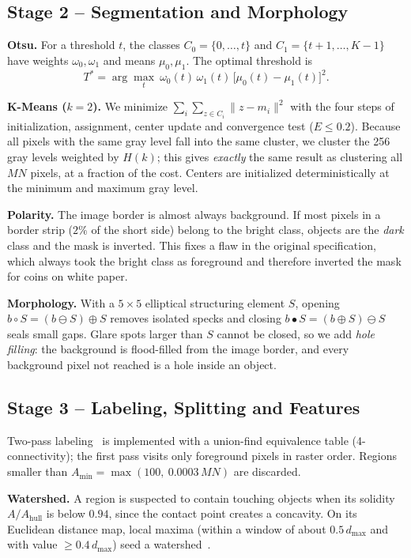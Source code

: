 \documentclass[conference,a4paper]{IEEEtran}
\begin{document}
\subsection{Stage 2 -- Segmentation and Morphology}
\textbf{Otsu.} For a threshold $t$, the classes $C_0=\{0,\dots,t\}$ and $C_1=\{t+1,\dots,K-1\}$ have weights $\omega_0,\omega_1$ and means $\mu_0,\mu_1$. The optimal threshold is
\begin{equation}
T^{*}=\arg\max_{t}\ \omega_0(t)\,\omega_1(t)\,\bigl[\mu_0(t)-\mu_1(t)\bigr]^2 .
\label{eq:otsu}
\end{equation}

\textbf{K-Means ($k=2$).} We minimize $\sum_i\sum_{z\in C_i}\lVert z-m_i\rVert^2$ with the four steps of initialization, assignment, center update and convergence test ($E\le0.2$). Because all pixels with the same gray level fall into the same cluster, we cluster the 256 gray levels weighted by $H(k)$; this gives \emph{exactly} the same result as clustering all $MN$ pixels, at a fraction of the cost. Centers are initialized deterministically at the minimum and maximum gray level.

\textbf{Polarity.} The image border is almost always background. If most pixels in a border strip ($2\%$ of the short side) belong to the bright class, objects are the \emph{dark} class and the mask is inverted. This fixes a flaw in the original specification, which always took the bright class as foreground and therefore inverted the mask for coins on white paper.

\textbf{Morphology.} With a $5\times5$ elliptical structuring element $S$, opening $b\circ S=(b\ominus S)\oplus S$ removes isolated specks and closing $b\bullet S=(b\oplus S)\ominus S$ seals small gaps. Glare spots larger than $S$ cannot be closed, so we add \emph{hole filling}: the background is flood-filled from the image border, and every background pixel not reached is a hole inside an object.

\subsection{Stage 3 -- Labeling, Splitting and Features}
Two-pass labeling~\cite{rosenfeld1966} is implemented with a union-find equivalence table (4-connectivity); the first pass visits only foreground pixels in raster order. Regions smaller than $A_{\min}=\max(100,\ 0.0003\,MN)$ are discarded.

\textbf{Watershed.} A region is suspected to contain touching objects when its solidity $A/A_{\text{hull}}$ is below $0.94$, since the contact point creates a concavity. On its Euclidean distance map, local maxima (within a window of about $0.5\,d_{\max}$ and with value $\ge0.4\,d_{\max}$) seed a watershed~\cite{vincent1991}.
\end{document}
